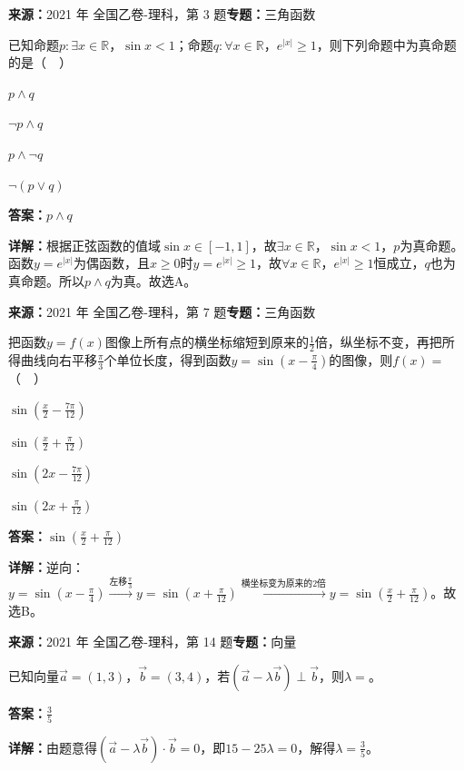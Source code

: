 \begin{question}[points=5]
\textbf{来源：}2021 年 全国乙卷-理科，第 3 题\quad \textbf{专题：}三角函数\par
已知命题$p:\exists x\in\mathbb{R}$，$\sin x<1$；命题$q:\forall x\in\mathbb{R}$，$e^{|x|}\geq 1$，则下列命题中为真命题的是（  ）
\begin{choices}
  \item $p\land q$
  \item $\lnot p\land q$
  \item $p\land \lnot q$
  \item $\lnot(p\lor q)$
\end{choices}
\begin{solution}
\textbf{答案：}$p\land q$

\textbf{详解：}根据正弦函数的值域$\sin x\in[-1,1]$，故$\exists x\in\mathbb{R}$，$\sin x<1$，$p$为真命题。函数$y=e^{|x|}$为偶函数，且$x\geq 0$时$y=e^{|x|}\geq 1$，故$\forall x\in\mathbb{R}$，$e^{|x|}\geq 1$恒成立，$q$也为真命题。所以$p\land q$为真。故选A。
\end{solution}
\end{question}

\begin{question}[points=5]
\textbf{来源：}2021 年 全国乙卷-理科，第 7 题\quad \textbf{专题：}三角函数\par
把函数$y=f(x)$图像上所有点的横坐标缩短到原来的$\frac12$倍，纵坐标不变，再把所得曲线向右平移$\frac{\pi}{3}$个单位长度，得到函数$y=\sin\left(x-\frac{\pi}{4}\right)$的图像，则$f(x)=$（  ）
\begin{choices}
  \item $\sin\left(\frac{x}{2}-\frac{7\pi}{12}\right)$
  \item $\sin\left(\frac{x}{2}+\frac{\pi}{12}\right)$
  \item $\sin\left(2x-\frac{7\pi}{12}\right)$
  \item $\sin\left(2x+\frac{\pi}{12}\right)$
\end{choices}
\begin{solution}
\textbf{答案：}$\sin\left(\frac{x}{2}+\frac{\pi}{12}\right)$

\textbf{详解：}逆向：$y=\sin\left(x-\frac{\pi}{4}\right) \xrightarrow{\text{左移}\frac{\pi}{3}} y=\sin\left(x+\frac{\pi}{12}\right) \xrightarrow{\text{横坐标变为原来的2倍}} y=\sin\left(\frac{x}{2}+\frac{\pi}{12}\right)$。故选B。
\end{solution}
\end{question}

\begin{question}[points=5]
\textbf{来源：}2021 年 全国乙卷-理科，第 14 题\quad \textbf{专题：}向量\par
已知向量$\vec{a}=(1,3)$，$\vec{b}=(3,4)$，若$(\vec{a}-\lambda\vec{b})\perp\vec{b}$，则$\lambda=$。
\fillin[{$\frac{3}{5}$}]
\begin{solution}
\textbf{答案：}$\frac{3}{5}$

\textbf{详解：}由题意得$(\vec{a}-\lambda\vec{b})\cdot\vec{b}=0$，即$15-25\lambda=0$，解得$\lambda=\frac{3}{5}$。
\end{solution}
\end{question}

